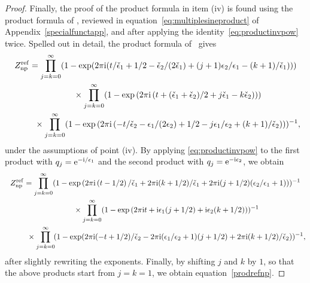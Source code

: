 \documentclass[pdftex]{sigma}
\numberwithin{equation}{section}
\begin{document}
\begin{proof}
 Finally, the proof of the product formula in item (iv) is found using the product formula of \cite[Corollary~6]{Narukawa}, reviewed in equation~\eqref{eq:multiplesineproduct} of Appendix~\ref{specialfunctapp}, and after applying the identity~\eqref{eq:productinvpow} twice. Spelled out in detail, the product formula of~\cite{Narukawa} gives
 \begin{gather*}
 Z_{{\rm np}}^{\rm ref}= \prod_{j=k=0}^{\infty}(1-\exp(2\pi \mathrm{i}(t/\check{\epsilon}_1+1/2-\check{\epsilon}_2/(2\check{\epsilon}_1) +(j+1)\epsilon_2/\epsilon_1 -(k+1)/\check\epsilon_1)))\\
 \hphantom{Z_{{\rm np}}^{\rm ref}=}{}\times
 \prod_{j=k=0}^{\infty} (1-\exp\left(2\pi \mathrm{i}\left(t+(\check{\epsilon}_1+\check{\epsilon}_2)/2+j\check{\epsilon}_1 -k\check{\epsilon}_2\right)\right))\\
\hphantom{Z_{{\rm np}}^{\rm ref}=}{}\times
 \prod_{j=k=0}^{\infty} (1-\exp\left(2\pi \mathrm{i}\left(-t/\check{\epsilon}_2 -\epsilon_1/(2\epsilon_2) +1/2 -j\epsilon_1/\epsilon_2 +(k+1)/\check{\epsilon}_2\right)\right))^{-1},
 \end{gather*}
 under the assumptions of point (iv).
 By applying \eqref{eq:productinvpow} to the first product with $q_j={\rm e}^{-\mathrm{i}/\epsilon_1}$ and the second product with $q_j={\rm e}^{-\mathrm{i}\epsilon_2}$, we obtain
 \begin{gather*}
 Z_{{\rm np}}^{\rm ref}= \prod_{j=k=0}^{\infty}(1-\exp\left(2\pi \mathrm{i}\left(t-1/2\right)/\check{\epsilon}_1+2\pi \mathrm{i}(k+1/2)/\check{\epsilon}_1 +2\pi \mathrm{i}(j+1/2)(\epsilon_2/\epsilon_1+1) \right))^{-1}\\
\hphantom{Z_{{\rm np}}^{\rm ref}=}{}\times
\prod_{j=k=0}^{\infty} (1-\exp\left(2\pi \mathrm{i} t+\mathrm{i}\epsilon_1(j+1/2)+\mathrm{i}\epsilon_2(k+1/2)\right))^{-1}\\
\hphantom{Z_{{\rm np}}^{\rm ref}=}{}\times
\prod_{j=k=0}^{\infty}\! (1-\exp(2\pi \mathrm{i}(-t+1/2)/\check{\epsilon}_2 -2\pi \mathrm{i}(\epsilon_1/\epsilon_2 +1)(j+1/2) +2\pi \mathrm{i}(k+1/2)/\check{\epsilon}_2))^{-1},
 \end{gather*}
 after slightly rewriting the exponents.
 Finally, by shifting $j$ and $k$ by $1$, so that the above products start from $j=k=1$, we obtain equation~\eqref{prodrefnp}.
\end{proof}
\end{document}
